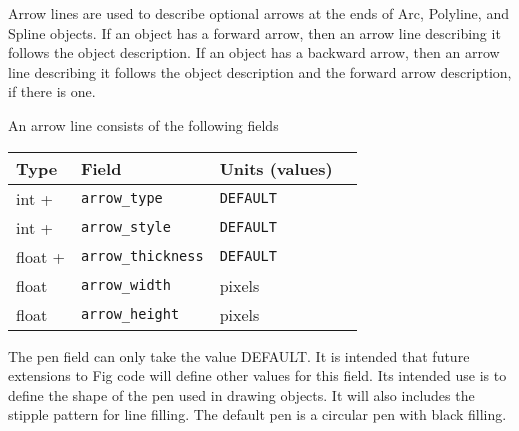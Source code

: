 Arrow lines are used to describe optional arrows at the ends of
	Arc, Polyline, and Spline objects.
If an object has a forward arrow, then an arrow line describing it
	follows the object description.
If an object has a backward arrow, then an arrow line describing it
	follows the object description and the forward arrow description,
	if there is one.

An arrow line consists of the following fields
%
\vspace{4pt}
\begin{center}
\begin{tabular} {|l|l|ll|}
\hline
Type	& Field			& Units (values)	&	\\ \hline
\hline
%
int +	& {\tt arrow\_type}	& {\tt DEFAULT}		&	\\ \hline
%
int +	& {\tt arrow\_style}	& {\tt DEFAULT}		&	\\ \hline
%
float +	& {\tt arrow\_thickness}& {\tt DEFAULT}		&	\\ \hline
%
float	& {\tt arrow\_width}	& pixels		&	\\ \hline
%
float	& {\tt arrow\_height}	& pixels		&	\\ \hline
\end{tabular}
\end{center}
\vspace{2pt}

The pen field can only take the value DEFAULT.
It is intended that future extensions to Fig code will define
	other values for this field.
Its intended use is to define the shape of the pen used in drawing objects.
It will also includes the stipple pattern for line filling.
The default pen is a circular pen with black filling.

